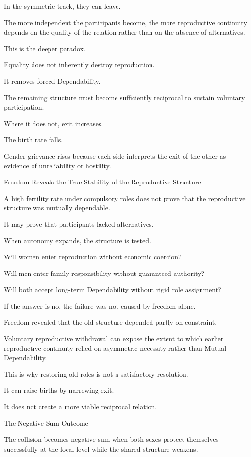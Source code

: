 In the symmetric track, they can leave.

The more independent the participants become, the more reproductive continuity depends on the quality of the relation rather than on the absence of alternatives.

This is the deeper paradox.

Equality does not inherently destroy reproduction.

It removes forced Dependability.

The remaining structure must become sufficiently reciprocal to sustain voluntary participation.

Where it does not, exit increases.

The birth rate falls.

Gender grievance rises because each side interprets the exit of the other as evidence of unreliability or hostility.

Freedom Reveals the True Stability of the Reproductive Structure

A high fertility rate under compulsory roles does not prove that the reproductive structure was mutually dependable.

It may prove that participants lacked alternatives.

When autonomy expands, the structure is tested.

Will women enter reproduction without economic coercion?

Will men enter family responsibility without guaranteed authority?

Will both accept long-term Dependability without rigid role assignment?

If the answer is no, the failure was not caused by freedom alone.

Freedom revealed that the old structure depended partly on constraint.

Voluntary reproductive withdrawal can expose the extent to which earlier reproductive continuity relied on asymmetric necessity rather than Mutual Dependability.

This is why restoring old roles is not a satisfactory resolution.

It can raise births by narrowing exit.

It does not create a more viable reciprocal relation.

The Negative-Sum Outcome

The collision becomes negative-sum when both sexes protect themselves successfully at the local level while the shared structure weakens.

